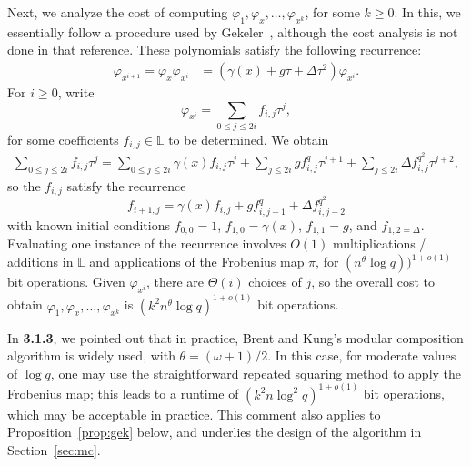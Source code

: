 \documentclass[sigconf]{acmart}
\renewcommand{\L}{\mathbb{L}}
\begin{document}
\smallskip{}
Next, we analyze the cost of computing 
$\varphi_1,\varphi_x,\dots,\varphi_{x^k}$, for some $k \ge 0$. In
this, we essentially follow a procedure used by
Gekeler~\cite[Section~3]{frobdist}, although the cost analysis is not
done in that reference. These polynomials satisfy the following
recurrence:
\begin{align*}
 \varphi_{x^{i+1}} = \varphi_x \varphi_{x^i} & = (\gamma(x) + g\tau + \Delta \tau^2) \varphi_{x^i}.
\end{align*}
For $i \ge 0$, write 
\[\varphi_{x^i}  = \sum_{0 \le j \leq 2i} f_{i,j} \tau^{j},\]
for some coefficients $f_{i,j} \in \L$ to be determined. We obtain
\begin{align*}
 \sum_{0 \le j \leq 2i} f_{i,j} \tau^{j} = \sum_{0 \le j \leq 2i} \gamma(x) f_{i,j} \tau^{j} + \sum_{j \leq 2i} g f_{i,j}^q \tau^{j+1} + \sum_{j \leq 2i} \Delta f_{i,j}^{q^2} \tau^{j+2},
\end{align*}
so the $f_{i,j}$ satisfy the recurrence
\[ f_{i+1,j} = \gamma(x) f_{i,j} + g f_{i,j-1}^q + \Delta f_{i,j-2}^{q^2}\]
with known initial conditions $f_{0,0} = 1$, $f_{1,0} = \gamma(x)$,
$f_{1,1} = g$, and $f_{1,2 = \Delta}$. Evaluating one instance of the
recurrence involves $O(1)$ multiplications / additions in $\L$ and
applications of the Frobenius map $\pi$, for $(n^\theta \log
q))^{1+o(1)}$ bit operations.  Given $\varphi_{x^i}$, there are
$\Theta(i)$ choices of $j$, so the overall cost to obtain
$\varphi_1,\varphi_x,\dots,\varphi_{x^k}$ is $(k^2 n^\theta \log
q)^{1+o(1)}$ bit operations.

In {\bf 3.1.3}, we pointed out that in practice, Brent and Kung's
modular composition algorithm is widely used, with
$\theta=(\omega+1)/2$. In this case, for moderate values of $\log q$,
one may use the straightforward repeated squaring method to apply the
Frobenius map; this leads to a runtime of $(k^2 n \log^2 q)^{1+o(1)}$
bit operations, which may be acceptable in practice. This comment also
applies to Proposition~\ref{prop:gek} below, and underlies the design
of the algorithm in Section~\ref{sec:mc}.
\end{document}
